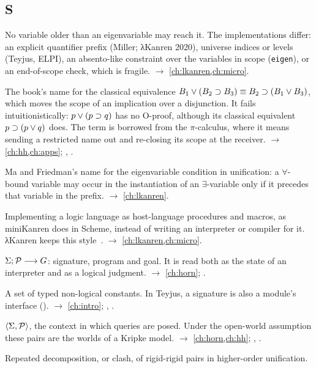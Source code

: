 \subsection*{S}
\begin{glossarylist}
\item[Scope check, eigenvariable condition] No variable older than an eigenvariable may reach it. The
  implementations differ: an explicit quantifier prefix (Miller; λKanren 2020), universe indices or levels
  (Teyjus, ELPI), an absento-like constraint over the variables in scope (\texttt{eigen}), or an end-of-scope check,
  which is fragile. $\rightarrow$ \cref{ch:lkanren,ch:micro}.
\item[Scope extrusion] The book's name for the classical equivalence
  $B_1\vee(B_2\supset B_3)\equiv B_2\supset(B_1\vee B_3)$, which moves the scope of an implication over a disjunction. It
  fails intuitionistically: $p\vee(p\supset q)$ has no O-proof, although its classical equivalent $p\supset(p\vee q)$ does. The
  term is borrowed from the $\pi$-calculus, where it means sending a restricted name out and re-closing its scope at
  the receiver. $\rightarrow$ \cref{ch:hh,ch:apps}; , .
\item[Scope restriction] Ma and Friedman's name for the eigenvariable condition in unification: a $\forall$-bound
  variable may occur in the instantiation of an $\exists$-variable only if it precedes that variable in the
  prefix. $\rightarrow$ \cref{ch:lkanren}.
\item[Shallow embedding] Implementing a logic language as host-language procedures and macros, as miniKanren
  does in Scheme, instead of writing an interpreter or compiler for it. λKanren keeps this
  style~\cite{MaLuFriedman2020}. $\rightarrow$ \cref{ch:lkanren,ch:micro}.
\item[Sequent] $\Sigma;\mathcal{P}\longrightarrow G$: signature, program and goal. It is read both as the state of an interpreter
  and as a logical judgment. $\rightarrow$ \cref{ch:horn}; .
\item[Signature] A set of typed non-logical constants. In Teyjus, a signature is also a module's interface
  (). $\rightarrow$ \cref{ch:intro}; , .
\item[Signature--program pair] $\langle\Sigma,\mathcal{P}\rangle$, the context in which queries are posed. Under the
  open-world assumption these pairs are the worlds of a Kripke model. $\rightarrow$ \cref{ch:horn,ch:hh};
  , .
\item[Simplification] Repeated decomposition, or clash, of rigid-rigid pairs in higher-order unification.

\end{glossarylist}
